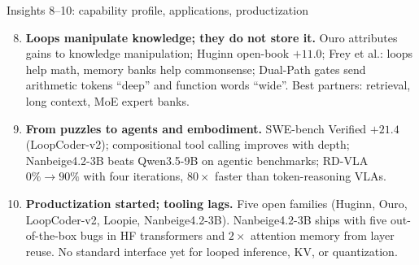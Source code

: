 \documentclass[aspectratio=169,10pt]{beamer}
\newcommand{\HL}[1]{\textcolor{emphasis}{#1}}
\begin{document}
\begin{frame}{Insights 8--10: capability profile, applications, productization}
  \begin{enumerate}\setcounter{enumi}{7}
    \item \textbf{Loops manipulate knowledge; they do not store it.} Ouro attributes gains to knowledge manipulation; Huginn open-book $+11.0$; Frey et al.: loops help math, memory banks help commonsense; Dual-Path gates send arithmetic tokens ``deep'' and function words ``wide''. Best partners: \HL{retrieval, long context, MoE expert banks}.
    \item \textbf{From puzzles to agents and embodiment.} SWE-bench Verified $+21.4$ (LoopCoder-v2); compositional tool calling improves with depth; Nanbeige4.2-3B beats Qwen3.5-9B on agentic benchmarks; RD-VLA $0\% \to 90\%$ with four iterations, $80\times$ faster than token-reasoning VLAs.
    \item \textbf{Productization started; tooling lags.} Five open families (Huginn, Ouro, LoopCoder-v2, Loopie, Nanbeige4.2-3B). Nanbeige4.2-3B ships with five out-of-the-box bugs in HF transformers and $2\times$ attention memory from layer reuse. No standard interface yet for looped inference, KV, or quantization.
  \end{enumerate}
\end{frame}
\end{document}
